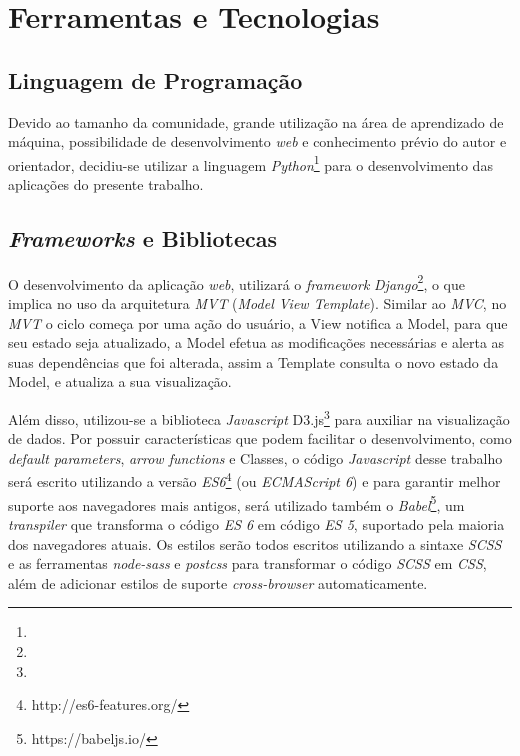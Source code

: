 \section{Ferramentas e Tecnologias}
\label{ferramentas}

\subsection{Linguagem de Programação}

Devido ao tamanho da comunidade, grande utilização na área de aprendizado de máquina, possibilidade de desenvolvimento \textit{web} e conhecimento prévio do autor e orientador, decidiu-se utilizar a linguagem \textit{Python}\footnote{} para o desenvolvimento das aplicações do presente trabalho.

\subsection{\textit{Frameworks} e Bibliotecas}

O desenvolvimento da aplicação \textit{web}, utilizará o \textit{framework} \textit{Django}\footnote{}, o que implica no uso da arquitetura \textit{MVT} (\textit{Model View Template}). Similar ao \textit{MVC}, no \textit{MVT} o ciclo começa por uma ação do usuário, a View notifica a Model, para que seu estado seja atualizado, a Model efetua as modificações necessárias e alerta as suas dependências que foi alterada, assim a Template consulta o novo estado da Model, e atualiza a sua visualização.

Além disso, utilizou-se a biblioteca \textit{Javascript} D3.js\footnote{} para auxiliar na visualização de dados. Por possuir características que podem facilitar o desenvolvimento, como \textit{default parameters}, \textit{arrow functions} e Classes, o código \textit{Javascript} desse trabalho será escrito utilizando a versão \textit{ES6}\footnote{http://es6-features.org/} (ou \textit{ECMAScript 6}) e para garantir melhor suporte aos navegadores mais antigos, será utilizado também o \textit{Babel}\footnote{https://babeljs.io/}, um \textit{transpiler} que transforma o código \textit{ES 6} em código \textit{ES 5}, suportado pela maioria dos navegadores atuais. Os estilos serão todos escritos utilizando a sintaxe \textit{SCSS} e as ferramentas \textit{node-sass} e \textit{postcss} para transformar o código \textit{SCSS} em \textit{CSS}, além de adicionar estilos de suporte \textit{cross-browser} automaticamente.


